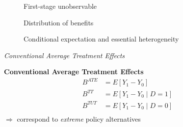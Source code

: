 \begin{frame}
\begin{figure}[htp]\centering\caption{First-stage unobservable}
\end{figure}
\end{frame}
\begin{frame}
\begin{figure}[htp]\centering\caption{Distribution of benefits}
\end{figure}
\end{frame}
\begin{frame}
	\begin{figure}\caption{Conditional expectation and essential heterogeneity}
	\end{figure}
\end{frame}
\begin{frame}\begin{center}
		\LARGE\textit{Conventional Average Treatment Effects}
\end{center}\end{frame}
\begin{frame}
	\textbf{Conventional Average Treatment Effects}
	\begin{align*}
		B^{ATE} & = E[Y_1 - Y_0 ]\\
		B^{TT} & = E[Y_1 - Y_0 \mid D = 1]\\
		B^{TUT} & = E[Y_1 - Y_0 \mid D = 0]\\
	\end{align*}
	\(\Rightarrow\) correspond to \emph{extreme} policy alternatives
\end{frame}
